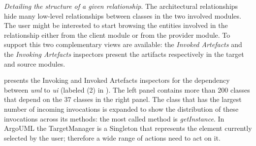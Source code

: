 \documentclass[preprint,12pt]{elsarticle}
\newcommand{\cd}[1]{{\em{#1}}}
\begin{document}
\begin{description}

\item {\em Detailing the structure of a given relationship}. The architectural relationships hide many low-level relationships between classes in the two involved modules. The user might be interested to start browsing the entities involved in the relationship either from the client module or from the provider module. To support this two complementary views are available: the {\em Invoked Artefacts} and the {\em Invoking Artefacts} inspectors present the artifacts respectively in the target and source modules. 


 presents the Invoking and Invoked Artefacts inspectors for the dependency between \cd{uml} to \cd{ui} (labeled (2) in ). The left panel contains more than 200 classes that depend on the 37 classes in the right panel. The class that has the largest number of incoming invocations is expanded to show the distribution of these invocations across its methods: the most called method is \cd{getInstance}. In ArgoUML the TargetManager is a Singleton that represents the element currently selected by the user; therefore a wide range of actions need to act on it.







\end{description}
\end{document}
